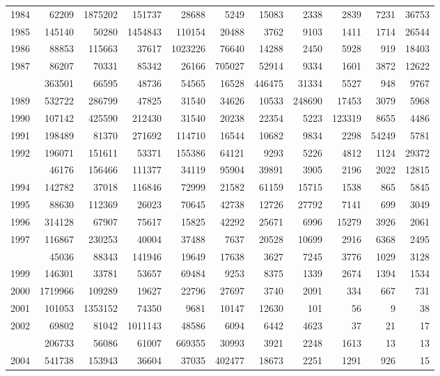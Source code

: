 \documentclass[
]{article}
\begin{document}
\begin{longtable}[t]{lrrrrrrrrrr}
1984 & 62209 & 1875202 & 151737 & 28688 & 5249 & 15083 & 2338 & 2839 & 7231 & 36753\\
1985 & 145140 & 50280 & 1454843 & 110154 & 20488 & 3762 & 9103 & 1411 & 1714 & 26544\\
1986 & 88853 & 115663 & 37617 & 1023226 & 76640 & 14288 & 2450 & 5928 & 919 & 18403\\
1987 & 86207 & 70331 & 85342 & 26166 & 705027 & 52914 & 9334 & 1601 & 3872 & 12622\\
\addlinespace
1988 & 363501 & 66595 & 48736 & 54565 & 16528 & 446475 & 31334 & 5527 & 948 & 9767\\
1989 & 532722 & 286799 & 47825 & 31540 & 34626 & 10533 & 248690 & 17453 & 3079 & 5968\\
1990 & 107142 & 425590 & 212430 & 31540 & 20238 & 22354 & 5223 & 123319 & 8655 & 4486\\
1991 & 198489 & 81370 & 271692 & 114710 & 16544 & 10682 & 9834 & 2298 & 54249 & 5781\\
1992 & 196071 & 151611 & 53371 & 155386 & 64121 & 9293 & 5226 & 4812 & 1124 & 29372\\
\addlinespace
1993 & 46176 & 156466 & 111377 & 34119 & 95904 & 39891 & 3905 & 2196 & 2022 & 12815\\
1994 & 142782 & 37018 & 116846 & 72999 & 21582 & 61159 & 15715 & 1538 & 865 & 5845\\
1995 & 88630 & 112369 & 26023 & 70645 & 42738 & 12726 & 27792 & 7141 & 699 & 3049\\
1996 & 314128 & 67907 & 75617 & 15825 & 42292 & 25671 & 6996 & 15279 & 3926 & 2061\\
1997 & 116867 & 230253 & 40004 & 37488 & 7637 & 20528 & 10699 & 2916 & 6368 & 2495\\
\addlinespace
1998 & 45036 & 88343 & 141946 & 19649 & 17638 & 3627 & 7245 & 3776 & 1029 & 3128\\
1999 & 146301 & 33781 & 53657 & 69484 & 9253 & 8375 & 1339 & 2674 & 1394 & 1534\\
2000 & 1719966 & 109289 & 19627 & 22796 & 27697 & 3740 & 2091 & 334 & 667 & 731\\
2001 & 101053 & 1353152 & 74350 & 9681 & 10147 & 12630 & 101 & 56 & 9 & 38\\
2002 & 69802 & 81042 & 1011143 & 48586 & 6094 & 6442 & 4623 & 37 & 21 & 17\\
\addlinespace
2003 & 206733 & 56086 & 61007 & 669355 & 30993 & 3921 & 2248 & 1613 & 13 & 13\\
2004 & 541738 & 153943 & 36604 & 37035 & 402477 & 18673 & 2251 & 1291 & 926 & 15\\

\end{longtable}
\end{document}
